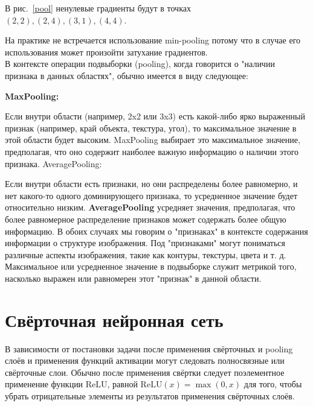 \documentclass{article}
\theoremstyle{definition}
\theoremstyle{theorem}
\theoremstyle{remark}
\theoremstyle{theorem}
\theoremstyle{example}
\theoremstyle{theorem}
\theoremstyle{theorem}
\theoremstyle{theorem}
\theoremstyle{theorem}
\begin{document}
	В рис.~\ref{pool} ненулевые градиенты будут в точках $(2,2), (2,4), (3,1), (4,4)$.
	
	На практике не встречается использование min-pooling потому что в случае его использования может произойти затухание градиентов.
	\\В контексте операции подвыборки (pooling), когда говорится о "наличии признака в данных областях", обычно имеется в виду следующее:
	
\textbf{	MaxPooling:}
	
	Если внутри области (например, 2x2 или 3x3) есть какой-либо ярко выраженный признак (например, край объекта, текстура, угол), то максимальное значение в этой области будет высоким.
	MaxPooling выбирает это максимальное значение, предполагая, что оно содержит наиболее важную информацию о наличии этого признака.
	AveragePooling:
	
	Если внутри области есть признаки, но они распределены более равномерно, и нет какого-то одного доминирующего признака, то усредненное значение будет относительно низким.
	\textbf{AveragePooling} усредняет значения, предполагая, что более равномерное распределение признаков может содержать более общую информацию.
	В обоих случаях мы говорим о "признаках" в контексте содержания информации о структуре изображения. Под "признаками" могут пониматься различные аспекты изображения, такие как контуры, текстуры, цвета и т. д. Максимальное или усредненное значение в подвыборке служит метрикой того, насколько выражен или равномерен этот "признак" в данной области.

		
	\section{Свёрточная нейронная сеть}
		В зависимости от постановки задачи после применения свёрточных и pooling слоёв и применения функций активации могут следовать полносвязные или свёрточные  слои. Обычно после применения свёртки следует поэлементное применение функции $\mathrm{ReLU}$, равной $\mathrm{ReLU}(x)=\max(0,x)$ для того, чтобы убрать отрицательные элементы из результатов применения свёрточных слоёв. 
		
\end{document}
